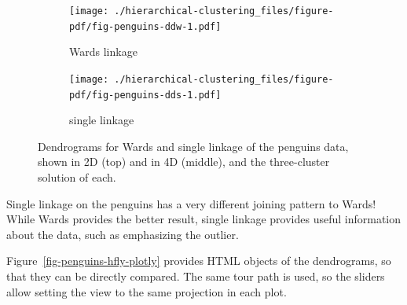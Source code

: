 \documentclass[
  letterpaper,
]{book}
\begin{document}
\begin{figure}

\begin{minipage}[t]{0.50\linewidth}

{\centering 

\begin{figure}

{\centering \texttt{[image: ./hierarchical-clustering\_files/figure-pdf/fig-penguins-ddw-1.pdf]}

}

\caption{Wards linkage}

\end{figure}

}

\end{minipage}%
%
\begin{minipage}[t]{0.50\linewidth}

{\centering 

\begin{figure}

{\centering \texttt{[image: ./hierarchical-clustering\_files/figure-pdf/fig-penguins-dds-1.pdf]}

}

\caption{single linkage}

\end{figure}

}

\end{minipage}%
\newline
\begin{minipage}[t]{0.50\linewidth}

{\centering 

}

\end{minipage}%

\caption{\label{fig-penguins-hfly}Dendrograms for Wards and single
linkage of the penguins data, shown in 2D (top) and in 4D (middle), and
the three-cluster solution of each.}

\end{figure}

Single linkage on the penguins has a very different joining pattern to
Wards! While Wards provides the better result, single linkage provides
useful information about the data, such as emphasizing the outlier.

Figure~\ref{fig-penguins-hfly-plotly} provides HTML objects of the
dendrograms, so that they can be directly compared. The same tour path
is used, so the sliders allow setting the view to the same projection in
each plot.
\end{document}
